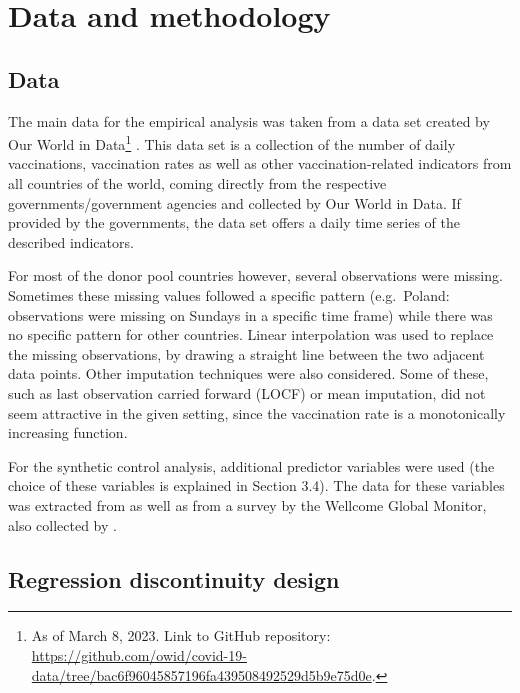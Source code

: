 \documentclass{scrbook}
\begin{document}
\chapter{Data and methodology}

\section{Data}

The main data for the empirical analysis was taken from a data set
created by Our World in
Data\footnote{As of March 8, 2023. Link to GitHub repository: \url{https://github.com/owid/covid-19-data/tree/bac6f96045857196fa439508492529d5b9e75d0e}.}
\parencite{mathieu_global_2021}. This data set is a collection of the
number of daily vaccinations, vaccination rates as well as other
vaccination-related indicators from all countries of the world, coming
directly from the respective governments/government agencies and
collected by Our World in Data. If provided by the governments, the data
set offers a daily time series of the described indicators.

For most of the donor pool countries however, several observations were
missing. Sometimes these missing values followed a specific pattern
(e.g.~Poland: observations were missing on Sundays in a specific time
frame) while there was no specific pattern for other countries. Linear
interpolation was used to replace the missing observations, by drawing a
straight line between the two adjacent data points. Other imputation
techniques were also considered. Some of these, such as last observation
carried forward (LOCF) or mean imputation, did not seem attractive in
the given setting, since the vaccination rate is a monotonically
increasing function.

For the synthetic control analysis, additional predictor variables were
used (the choice of these variables is explained in Section 3.4). The
data for these variables was extracted from
\textcite{eurostat_eurostat_2023} as well as from a survey by the
Wellcome Global Monitor, also collected by
\textcite{our_world_in_data_share_2020}.

\section{Regression discontinuity design}
\end{document}
